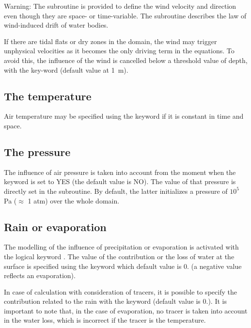\begin{WarningBlock}{Warning:}
The  subroutine is provided to define the wind velocity and
direction even though they are space- or time-variable.
The  subroutine describes the law of wind-induced drift
of water bodies.
\end{WarningBlock}

If there are tidal flats or dry zones in the domain, the wind may trigger
unphysical velocities as it becomes the only driving term in the equations. To
avoid this, the influence of the wind is cancelled below a threshold value of
depth, with the key-word  (default value at
1~m).


\subsection{The temperature}

Air temperature may be specified using the keyword  if
it is constant in time and space.


\subsection{The pressure}

The influence of air pressure is taken into account from the moment when the
keyword  is set to YES (the default value is
NO). The value of that pressure is directly set in the  subroutine.
By default, the latter initializes a pressure of $10^5$ Pa ($\approx$ 1 atm) over
the whole domain.


\subsection{Rain or evaporation}

The modelling of the influence of precipitation or evaporation is activated
with the logical keyword . The value of the
contribution or the loss of water at the surface is specified using the keyword
 which default value is 0. (a
negative value reflects an evaporation).

In case of calculation with consideration of tracers, it is possible to specify
the contribution related to the rain with the keyword  (default value is 0.). It is important to note that, in the case
of evaporation, no tracer is taken into account in the water loss, which is
incorrect if the tracer is the temperature.

